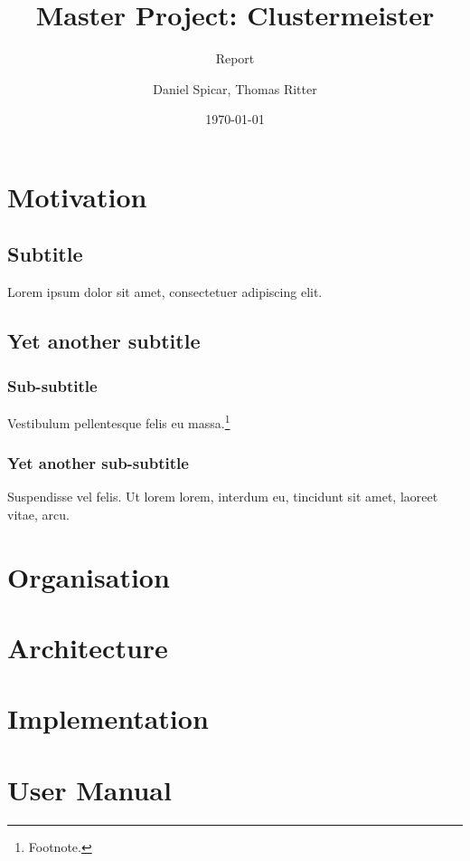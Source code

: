 \documentclass[english]{uzhpub}
\begin{document}
\title{Master Project: Clustermeister}

\subtitle{Report}

\author{Daniel Spicar, Thomas Ritter}

\date{\today}

\maketitle

\section{Motivation}

\subsection{Subtitle}

Lorem ipsum dolor sit amet, consectetuer adipiscing elit.

\subsection{Yet another subtitle}

\subsubsection{Sub-subtitle}

Vestibulum pellentesque felis eu massa.\footnote{Footnote.}

\subsubsection{Yet another sub-subtitle}

Suspendisse vel felis. Ut lorem lorem, interdum eu, tincidunt sit
amet, laoreet vitae, arcu.

\section{Organisation}



\section{Architecture}



\section{Implementation}



\section{User Manual}
\end{document}
